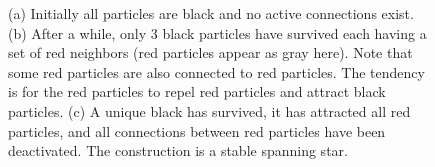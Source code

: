 \documentclass[oribibl, 11pt]{llncs}
\begin{document}
\begin{figure}[!hbtp]
   \caption{(a) Initially all particles are black and no active connections exist. (b) After a while, only 3 black particles have survived each having a set of red neighbors (red particles appear as gray here). Note that some red particles are also connected to red particles. The tendency is for the red particles to repel red particles and attract black particles. (c) A unique black has survived, it has attracted all red particles, and all connections between red particles have been deactivated. The construction is a stable spanning star.} \label{fig:global-star}
\end{figure}
\end{document}
